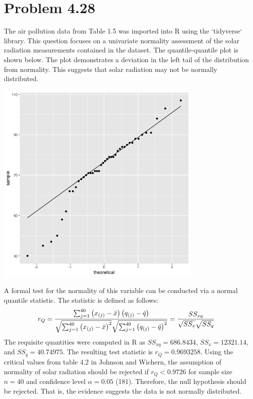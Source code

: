 


\maketitle

\section*{Problem 4.28}
The air pollution data from Table 1.5 was imported into R using the `tidyverse` library. This question focuses on a univariate normality assessment of the solar radiation measurements contained in the dataset. The quantile-quantile plot is shown below. The plot demonstrates a deviation in the left tail of the distribution from normality. This suggests that solar radiation may not be normally distributed.
\begin{center}
	\includegraphics[width=4in]{plot_4_28_qq.png}
\end{center}
A formal test for the normality of this variable can be conducted via a normal quantile statistic. The statistic is defined as follows: $$r_Q = \frac{\sum_{j = 1}^{40} \begin{pmatrix}x_{(j)} - \bar{x}\end{pmatrix} \begin{pmatrix}q_{(j)} - \bar{q}\end{pmatrix}}{\sqrt{\sum_{j = 1}^{40} \begin{pmatrix}x_{(j)} - \bar{x}\end{pmatrix}^2} \sqrt{\sum_{j = 1}^{40} \begin{pmatrix}q_{(j)} - \bar{q}\end{pmatrix}^2}} = \frac{SS_{xq}}{\sqrt{SS_x} \sqrt{SS_q}}$$ The requisite quantities were computed in R as $SS_{xq} = 686.8434$, $SS_x = 12321.14$, and $SS_q = 40.74975$. The resulting test statistic is $r_Q = 0.9693258$. Using the critical values from table 4.2 in Johnson and Wichern, the assumption of normality of solar radiation should be rejected if $r_Q < 0.9726$ for sample size $n = 40$ and confidence level $\alpha = 0.05$ (181). Therefore, the null hypothesis should be rejected. That is, the evidence suggests the data is not normally distributed.

